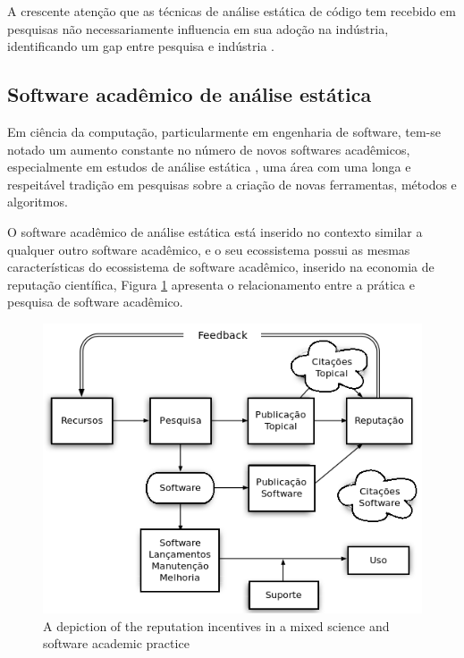 A crescente atenção que as técnicas de análise estática de código tem
recebido em pesquisas não necessariamente influencia em sua adoção na indústria,
identificando um gap entre pesquisa e indústria \cite{ilyas2016static}.



\subsection{Software acadêmico de análise estática}

Em ciência da computação, particularmente em engenharia de software, tem-se
notado um aumento constante no número de novos softwares acadêmicos,
especialmente em estudos de análise estática \cite{allen2017engineering}, 
uma área com uma longa e respeitável tradição em
pesquisas sobre a criação de novas ferramentas, métodos e algoritmos.


O software acadêmico de análise estática está inserido no contexto similar
a qualquer outro software acadêmico, e o seu ecossistema possui as mesmas
características do ecossistema de software acadêmico, inserido na economia
de reputação científica, Figura \ref{scientific-reputation-diagram} apresenta
o relacionamento entre a prática e pesquisa de software acadêmico.

\begin{figure}[h]
  \center
  \includegraphics[scale=0.5]{imagens/scientific-reputation-diagram-dia.png}
  \caption{A depiction of the reputation incentives in a mixed science and software academic practice \cite{howison2011scientific}}
  \label{scientific-reputation-diagram}
\end{figure}

